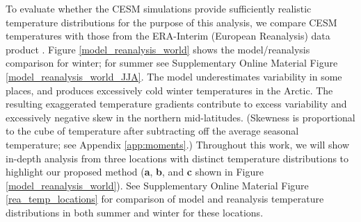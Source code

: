 \documentclass{ametsoc}
\begin{document}
To evaluate whether the CESM simulations provide sufficiently realistic temperature distributions for the purpose of this analysis, we compare CESM temperatures with those from the ERA-Interim (European Reanalysis) data product \citep{dee2011era}. Figure \ref{model_reanalysis_world} shows the model/reanalysis comparison for winter; for summer see Supplementary Online Material Figure \ref{model_reanalysis_world_JJA}. The model underestimates variability in some places, and produces excessively cold winter temperatures in the Arctic. The resulting exaggerated temperature gradients contribute to excess variability and excessively negative skew in the northern mid-latitudes.
(Skewness is proportional to the cube of temperature after subtracting off the average seasonal temperature; see Appendix \ref{app:moments}.) %
Throughout this work, we will show in-depth analysis from three locations with distinct temperature distributions to highlight our proposed method (\textbf{a}, \textbf{b}, and \textbf{c} shown in Figure \ref{model_reanalysis_world}). See Supplementary Online Material Figure \ref{rea_temp_locations} for comparison of model and reanalysis temperature distributions in both summer and winter for these locations. 
 
\end{document}
